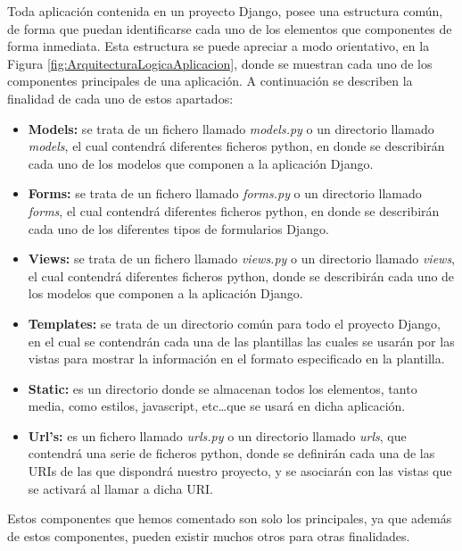 Toda aplicación contenida en un proyecto Django, posee una estructura común, de
forma que puedan identificarse cada uno de los elementos que componentes de
forma inmediata. Esta estructura se puede apreciar a modo orientativo, en la
Figura \ref{fig:ArquitecturaLogicaAplicacion}, donde se muestran cada uno de los
componentes principales de una aplicación. A continuación se describen la
finalidad de cada uno de estos apartados:
\begin{itemize}
    \item \textbf{Models:} se trata de un fichero llamado \textit{models.py} o
        un directorio llamado \textit{models}, el cual contendrá diferentes
        ficheros python, en donde se describirán cada uno de los modelos que
        componen a la aplicación Django.
    \item \textbf{Forms:} se trata de un fichero llamado \textit{forms.py} o un
        directorio llamado \textit{forms}, el cual contendrá diferentes ficheros
        python, en donde se describirán cada uno de los diferentes tipos de
        formularios Django.
    \item \textbf{Views:} se trata de un fichero llamado \textit{views.py} o un
        directorio llamado \textit{views}, el cual contendrá diferentes ficheros
        python, donde se describirán cada uno de los modelos que componen a la
        aplicación Django.
    \item \textbf{Templates:} se trata de un directorio común para todo el
        proyecto Django, en el cual se contendrán cada una de las plantillas las
        cuales se usarán por las vistas para mostrar la información en el
        formato especificado en la plantilla.
    \item \textbf{Static:} es un directorio donde se almacenan todos los
        elementos, tanto media, como estilos, javascript, etc\ldots que se
        usará en dicha aplicación.
    \item \textbf{Url's:} es un fichero llamado \textit{urls.py} o un directorio
        llamado \textit{urls}, que contendrá una serie de ficheros python, donde
        se definirán cada una de las URIs de las que dispondrá nuestro proyecto,
        y se asociarán con las vistas que se activará al llamar a dicha URI.
\end{itemize}

Estos componentes que hemos comentado son solo los principales, ya que además de
estos componentes, pueden existir muchos otros para otras finalidades.

\newpage

